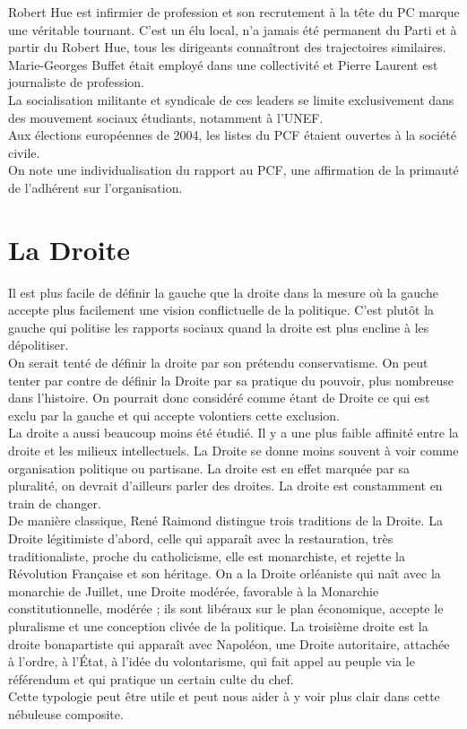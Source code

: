 \documentclass[10pt, a4paper, openany]{book}
\begin{document}
Robert Hue est infirmier de profession et son recrutement à la tête du PC marque une véritable tournant. C'est un élu local, n'a jamais été permanent du Parti et à partir du Robert Hue, tous les dirigeants connaîtront des trajectoires similaires. Marie-Georges Buffet était employé dans une collectivité et Pierre Laurent est journaliste de profession. \\
La socialisation militante et syndicale de ces leaders se limite exclusivement dans des mouvement sociaux étudiants, notamment à l'UNEF. \\
Aux élections européennes de 2004, les listes du PCF étaient ouvertes à la société civile. \\
On note une individualisation du rapport au PCF, une affirmation de la primauté de l'adhérent sur l'organisation.  


\chapter{La Droite}

Il est plus facile de définir la gauche que la droite dans la mesure où la gauche accepte plus facilement une vision conflictuelle de la politique. C'est plutôt la gauche qui politise les rapports sociaux quand la droite est plus encline à les dépolitiser. \\
On serait tenté de définir la droite par son prétendu conservatisme. On peut tenter par contre de définir la Droite par sa pratique du pouvoir, plus nombreuse dans l'histoire. On pourrait donc considéré comme étant de Droite ce qui est exclu par la gauche et qui accepte volontiers cette exclusion. \\
La droite a aussi beaucoup moins été étudié. Il y a une plus faible affinité entre la droite et les milieux intellectuels. La Droite se donne moins souvent à voir comme organisation politique ou partisane. La droite est en effet marquée par sa pluralité, on devrait d'ailleurs parler des droites. La droite est constamment en train de changer. \\
De manière classique, René Raimond distingue trois traditions de la Droite. La Droite légitimiste d'abord, celle qui apparaît avec la restauration, très traditionaliste, proche du catholicisme, elle est monarchiste, et rejette la Révolution Française et son héritage. On a la Droite orléaniste qui naît avec la monarchie de Juillet, une Droite modérée, favorable à la Monarchie constitutionnelle, modérée ; ils sont libéraux sur le plan économique, accepte le pluralisme et une conception clivée de la politique. La troisième droite est la droite bonapartiste qui apparaît avec Napoléon, une Droite autoritaire, attachée à l'ordre, à l'État, à l'idée du volontarisme, qui fait appel au peuple via le référendum et qui pratique un certain culte du chef. \\
Cette typologie peut être utile et peut nous aider à y voir plus clair dans cette nébuleuse composite. 
\end{document}
